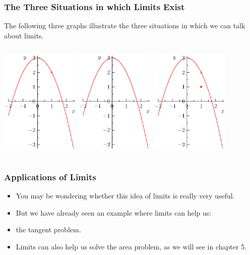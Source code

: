 \documentclass[serif,ignorenonframetext]{beamer}
\begin{document}
\begin{frame}
  \frametitle{The Three Situations in which Limits Exist}
  The following three graphs illustrate the three situations in which
  we can talk about limits.
  \begin{columns}
  \includegraphics[height=5cm]{graph5.eps}
  \includegraphics[height=5cm]{graph6.eps}
  \includegraphics[height=5cm]{graph7.eps}
  \end{columns}
\end{frame}

\begin{frame}
  \frametitle{Applications of Limits}
  \begin{itemize}
  \item You may be wondering whether this idea of limits is really
    very useful.  
    \pause
  \item But we have already seen an example where limits can help us:
    \pause
  \item the tangent problem.
    \pause
  \item Limits can also help us solve the area problem, as we will
    see in chapter 5.
  \end{itemize}
\end{frame}
\end{document}

